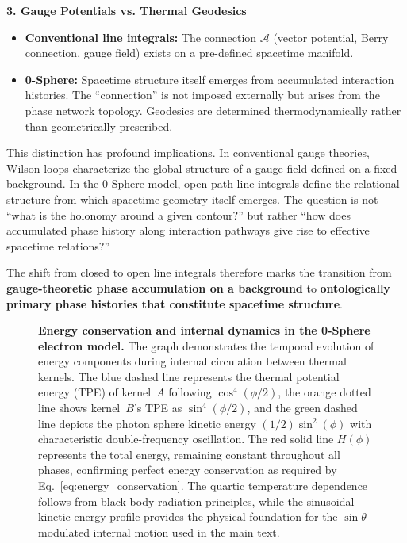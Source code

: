 \documentclass[12pt,letterpaper]{article}
\begin{document}
\textbf{3. Gauge Potentials vs. Thermal Geodesics}
\begin{itemize}
\item \textbf{Conventional line integrals:} The connection $\mathcal{A}$ (vector potential, Berry connection, gauge field) exists on a pre-defined spacetime manifold.
\item \textbf{0-Sphere:} Spacetime structure itself emerges from accumulated interaction histories. The ``connection'' is not imposed externally but arises from the phase network topology. Geodesics are determined thermodynamically rather than geometrically prescribed.
\end{itemize}

This distinction has profound implications. In conventional gauge theories, Wilson loops characterize the global structure of a gauge field defined on a fixed background. In the 0-Sphere model, open-path line integrals define the relational structure from which spacetime geometry itself emerges. The question is not ``what is the holonomy around a given contour?'' but rather ``how does accumulated phase history along interaction pathways give rise to effective spacetime relations?''

The shift from closed to open line integrals therefore marks the transition from \textbf{gauge-theoretic phase accumulation on a background} to \textbf{ontologically primary phase histories that constitute spacetime structure}.



\begin{figure}[t!] %
    \centering 
    \resizebox{\textwidth}{!}{%
    }
    \caption{\justifying \textbf{Energy conservation and internal dynamics in the 0-Sphere electron model.} The graph demonstrates the temporal evolution of energy components during internal circulation between thermal kernels. The blue dashed line represents the thermal potential energy (TPE) of kernel~$A$ following $\cos^4(\phi/2)$, the orange dotted line shows kernel~$B$'s TPE as $\sin^4(\phi/2)$, and the green dashed line depicts the photon sphere kinetic energy $(1/2)\sin^2(\phi)$ with characteristic double-frequency oscillation. The red solid line $H(\phi)$ represents the total energy, remaining constant throughout all phases, confirming perfect energy conservation as required by Eq.~\eqref{eq:energy_conservation}. The quartic temperature dependence follows from black-body radiation principles, while the sinusoidal kinetic energy profile provides the physical foundation for the $\sin\theta$-modulated internal motion used in the main text.
    }
    \label{fig:energy_conservation}
\end{figure}
\end{document}
